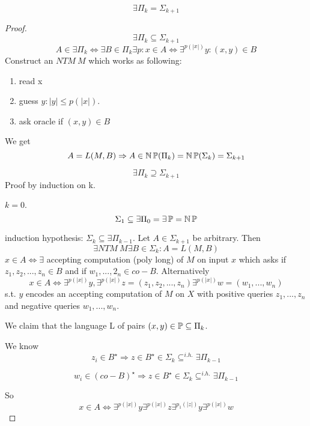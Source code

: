 \begin{theorem}
	\[ \exists \Pi_k = \Sigma_{k + 1} \]
\end{theorem}
\begin{proof}
	\[ \exists \Pi_k \subseteq \Sigma_{k + 1} \]
	\[ A \in \exists \Pi_k \iff \exists B \in \Pi_k \exists p: x \in A \iff \exists^{p(|x|)} y: (x,y) \in B \]
	Construct an $NTM\ M$ which works as following:
	\begin{enumerate}
		\item read x
		\item guess $y: |y| \leq p(|x|)$.
		\item ask oracle if $(x,y) \in B$
	\end{enumerate}

	We get
	\[ A = L(M, B) \Rightarrow A \in \operatorname{\operatorname{\mathbb{N}}\mathbb{P}}(\Pi_k) = \operatorname{\operatorname{\mathbb{N}}\mathbb{P}}(\Sigma_k) = \Sigma_{k + 1} \]

	\[ \exists \Pi_k \supseteq \Sigma_{k + 1} \]
	Proof by induction on k.

	$k = 0$.
	\[ \Sigma_1 \subseteq \exists \Pi_0 = \exists \operatorname{\mathbb{P}} = \operatorname{\operatorname{\mathbb{N}}\mathbb{P}} \]

	induction hypothesis: $\Sigma_k \subseteq \exists \Pi_{k - 1}$.
	Let $A \in \Sigma_{k + 1}$ be arbitrary.
	Then
	\[ \exists NTM\ M \exists B \in \Sigma_k: A = L(M, B) \]
	$x \in A \iff \exists$ accepting computation (poly long) of $M$ on input $x$ which asks if $z_1, z_2, ..., z_n \in B$ and if $w_1, ..., 2_n \in co-B$.
	Alternatively
	\[ x \in A \iff \exists^{p(|x|)} y, \exists^{p(|x|)} z = (z_1, z_2, ..., z_n) \exists^{p(|x|)} w = (w_1, ..., w_n)\]
	s.t. $y$ encodes an accepting computation of $M$ on $X$ with positive queries $z_1, ..., z_n$ and negative queries $w_1, ..., w_n$.

	We claim that the language L of pairs $(x, y) \in \operatorname{\mathbb{P}} \subseteq \Pi_k$.

	We know
	\[ z_i \in B^{\star} \Rightarrow z \in B^{\star} \in \Sigma_k \subseteq^{i.h.} \exists \Pi_{k - 1}\]

	\[ w_i \in (co-B)^{\star} \Rightarrow z \in B^{\star} \in \Sigma_k \subseteq^{i.h.} \exists \Pi_{k - 1}\]

	So
	\[x \in A \iff \exists^{p(|x|)} y \exists^{p(|x|)} z \exists^{p_1(|z|)} y \exists^{p(|x|)} w\]
\end{proof}

